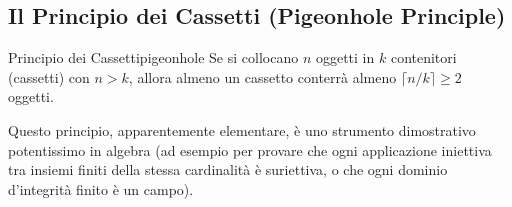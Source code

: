 \subsection{Il Principio dei Cassetti (Pigeonhole Principle)}
\begin{teorema}{Principio dei Cassetti}{pigeonhole}
Se si collocano $n$ oggetti in $k$ contenitori (cassetti) con $n > k$, allora almeno un cassetto conterrà almeno $\lceil n/k \rceil \ge 2$ oggetti.
\end{teorema}
Questo principio, apparentemente elementare, è uno strumento dimostrativo potentissimo in algebra (ad esempio per provare che ogni applicazione iniettiva tra insiemi finiti della stessa cardinalità è suriettiva, o che ogni dominio d'integrità finito è un campo).
